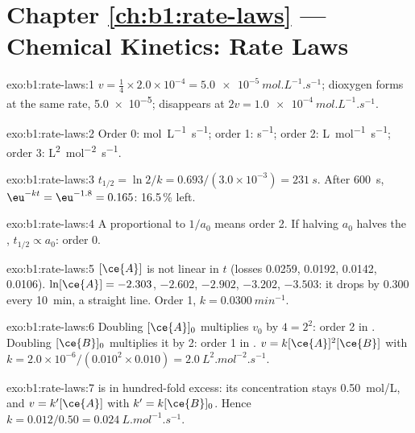 \section*{Chapter \ref{ch:b1:rate-laws} --- Chemical Kinetics: Rate Laws}

\begin{solution}{exo:b1:rate-laws:1}
$v = \frac14 \times 2.0 \times 10^{-4} = \qty{5.0e-5}{mol.L^{-1}.s^{-1}}$;
dioxygen forms at the same rate, \qty{5.0e-5}{};  disappears at
$2v = \qty{1.0e-4}{mol.L^{-1}.s^{-1}}$.
\end{solution}

\begin{solution}{exo:b1:rate-laws:2}
Order 0: \unit{mol.L^{-1}.s^{-1}}; order 1: \unit{s^{-1}}; order 2:
\unit{L.mol^{-1}.s^{-1}}; order 3: \unit{L^2.mol^{-2}.s^{-1}}.
\end{solution}

\begin{solution}{exo:b1:rate-laws:3}
$t_{1/2} = \ln2/k = 0.693/(3.0 \times 10^{-3}) = \qty{231}{s}$. After
\qty{600}{s}, $\eu^{-kt} = \eu^{-1.8} = 0.165$: 16.5\,\% left.
\end{solution}

\begin{solution}{exo:b1:rate-laws:4}
A  proportional to $1/a_0$ means order 2. If halving $a_0$
halves the , $t_{1/2} \propto a_0$: order 0.
\end{solution}

\begin{solution}{exo:b1:rate-laws:5}
$[\ce{A}]$ is not linear in $t$ (losses 0.0259, 0.0192, 0.0142, 0.0106).
$\ln[\ce{A}] = -2.303$, $-2.602$, $-2.902$, $-3.202$, $-3.503$: it drops by
0.300 every \qty{10}{min}, a straight line. Order 1, $k =
\qty{0.0300}{min^{-1}}$.
\end{solution}

\begin{solution}{exo:b1:rate-laws:6}
Doubling $[\ce{A}]_0$ multiplies $v_0$ by $4 = 2^2$: order 2 in .
Doubling $[\ce{B}]_0$ multiplies it by 2: order 1 in . $v =
k[\ce{A}]^2[\ce{B}]$ with $k = 2.0 \times 10^{-6}/(0.010^2 \times 0.010) =
\qty{2.0}{L^2.mol^{-2}.s^{-1}}$.
\end{solution}

\begin{solution}{exo:b1:rate-laws:7}
 is in hundred-fold excess: its concentration stays
\qty{0.50}{mol/L}, and $v = k'[\ce{A}]$ with $k' = k[\ce{B}]_0$. Hence
$k = 0.012/0.50 = \qty{0.024}{L.mol^{-1}.s^{-1}}$.
\end{solution}

